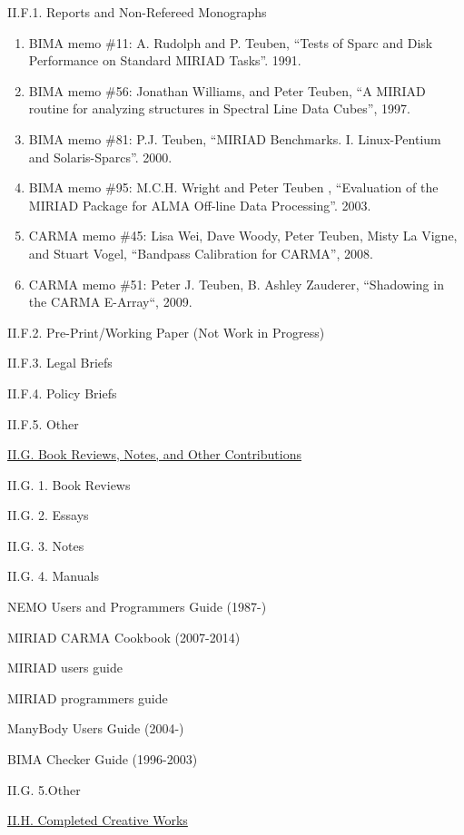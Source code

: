 \documentclass[11pt,letterpaper]{article}
\begin{document}
II.F.1. Reports and Non-Refereed Monographs


\begin{enumerate}[resume,label=\textbf{\arabic*}.]  
\item
BIMA memo \#11: A. Rudolph and P. Teuben,
``Tests of Sparc and Disk Performance on Standard MIRIAD Tasks''. 1991.

\item
BIMA memo \#56: Jonathan Williams, and Peter Teuben,
``A MIRIAD routine for analyzing structures in Spectral Line Data Cubes'', 1997.

\item
BIMA memo \#81: P.J. Teuben,
``MIRIAD Benchmarks. I. Linux-Pentium and Solaris-Sparcs''. 2000.

\item
BIMA memo \#95: M.C.H. Wright and Peter Teuben ,
``Evaluation of the MIRIAD Package for ALMA Off-line Data Processing''. 2003.

\item
CARMA memo \#45:  Lisa Wei, Dave Woody, Peter Teuben, Misty La Vigne, and Stuart Vogel,
``Bandpass Calibration for CARMA'', 2008.

\item
CARMA memo \#51: Peter J. Teuben, B. Ashley Zauderer,
``Shadowing in the CARMA E-Array``, 2009.
\end{enumerate}
               
II.F.2. Pre-Print/Working Paper (Not Work in Progress)

II.F.3. Legal Briefs

II.F.4. Policy Briefs

II.F.5. Other


\underline{II.G. Book Reviews, Notes, and Other Contributions}

II.G. 1. Book Reviews


II.G. 2. Essays

II.G. 3. Notes

II.G. 4. Manuals

NEMO Users and Programmers Guide (1987-)

MIRIAD CARMA Cookbook (2007-2014)

MIRIAD users guide

MIRIAD programmers guide

ManyBody Users Guide (2004-)

BIMA Checker Guide (1996-2003)


II.G. 5.Other


\underline{II.H. Completed Creative Works}
\end{document}
